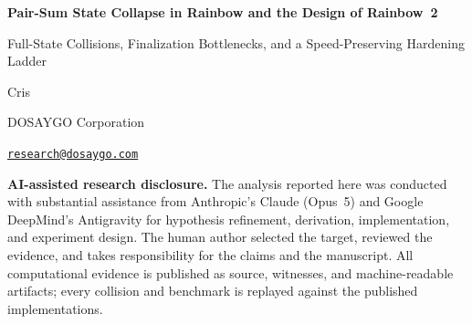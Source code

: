 \documentclass[10pt]{article}
\theoremstyle{definition}
\begin{document}
\begin{center}
  {\LARGE\bfseries\color{Navy} Pair-Sum State Collapse in Rainbow and the Design of Rainbow~2}\par
  \vspace{0.3em}
  {\large Full-State Collisions, Finalization Bottlenecks, and a Speed-Preserving Hardening Ladder}\par
  \vspace{0.6em}
  {\large Cris}\par
  DOSAYGO Corporation\par
  \href{mailto:research@dosaygo.com}{\texttt{research@dosaygo.com}}
\end{center}

\noindent\textbf{AI-assisted research disclosure.}
The analysis reported here was conducted with substantial assistance from Anthropic's Claude (Opus~5) and Google DeepMind's Antigravity for hypothesis refinement, derivation, implementation, and experiment design. The human author selected the target, reviewed the evidence, and takes responsibility for the claims and the manuscript. All computational evidence is published as source, witnesses, and machine-readable artifacts; every collision and benchmark is replayed against the published implementations.
\end{document}
